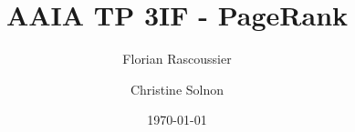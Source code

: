 
\newcommand{\thetitle}{AAIA TP 3IF - PageRank}
\newcommand{\theauthor}{Florian Rascoussier \and Christine Solnon}

\title{\thetitle}
\author{\theauthor}
\date{\today}